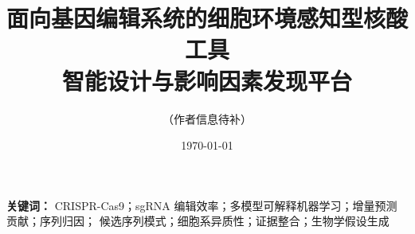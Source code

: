 \documentclass[11pt,a4paper]{ctexart}
\title{\bfseries 面向基因编辑系统的细胞环境感知型核酸工具\\智能设计与影响因素发现平台}
\author{（作者信息待补）}
\date{\today}
\begin{document}
\maketitle

\begin{abstract}

\end{abstract}

\noindent\textbf{关键词：} CRISPR-Cas9；sgRNA 编辑效率；多模型可解释机器学习；增量预测贡献；序列归因；
候选序列模式；细胞系异质性；证据整合；生物学假设生成












\clearpage
\appendix

\end{document}
